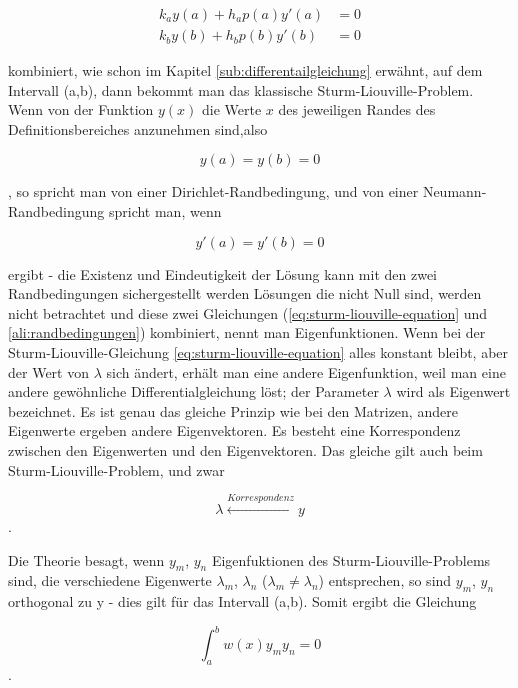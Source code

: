 \begin{equation}
\begin{aligned}
	\label{eq:randbedingungen}
	k_a y(a) + h_a p(a) y'(a) &= 0 \\
	k_b y(b) + h_b p(b) y'(b) &= 0
\end{aligned}
\end{equation}

kombiniert, wie schon im Kapitel \ref{sub:differentailgleichung} erwähnt, auf dem Intervall (a,b), dann bekommt man das klassische Sturm-Liouville-Problem.
Wenn von der Funktion $y(x)$ die Werte $x$ des jeweiligen Randes des Definitionsbereiches anzunehmen sind,also

\begin{equation}
	y(a) = y(b) = 0
\end{equation}

, so spricht man von einer Dirichlet-Randbedingung, und von einer Neumann-Randbedingung spricht man, wenn

\begin{equation}
	y'(a) = y'(b) = 0
\end{equation}

ergibt - die Existenz und Eindeutigkeit der Lösung kann mit den zwei Randbedingungen sichergestellt werden
Lösungen die nicht Null sind, werden nicht betrachtet und diese zwei Gleichungen (\ref{eq:sturm-liouville-equation} und \ref{ali:randbedingungen}) kombiniert, nennt man Eigenfunktionen.
Wenn bei der Sturm-Liouville-Gleichung \ref{eq:sturm-liouville-equation} alles  konstant bleibt, aber der Wert von $\lambda$ sich ändert, erhält man eine andere Eigenfunktion, weil man eine andere gewöhnliche Differentialgleichung löst;
der Parameter $\lambda$ wird als Eigenwert bezeichnet.
Es ist genau das gleiche Prinzip wie bei den Matrizen, andere Eigenwerte ergeben andere Eigenvektoren.
Es besteht eine Korrespondenz zwischen den Eigenwerten und den Eigenvektoren.
Das gleiche gilt auch beim Sturm-Liouville-Problem, und zwar

\begin{equation}
	\lambda \overset{Korrespondenz}\leftrightarrow y
\end{equation}.

Die Theorie besagt, wenn $y_m$, $y_n$ Eigenfuktionen des Sturm-Liouville-Problems sind, die verschiedene Eigenwerte $\lambda_m$, $\lambda_n$ ($\lambda_m \neq \lambda_n$) entsprechen, so sind $y_m$, $y_n$ orthogonal zu y -
dies gilt für das Intervall (a,b).
Somit ergibt die Gleichung

\begin{equation}
	\int_{a}^{b} w(x)y_m y_n = 0
\end{equation}.


